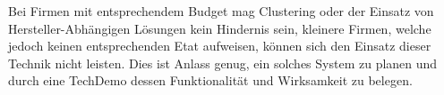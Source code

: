   Bei Firmen mit entsprechendem Budget mag Clustering oder der Einsatz von Hersteller-Abh\"angigen L\"osungen kein Hindernis sein, kleinere Firmen, welche jedoch keinen entsprechenden Etat aufweisen, k\"onnen sich den Einsatz dieser Technik nicht leisten. Dies ist Anlass genug, ein solches System zu planen und durch eine TechDemo dessen Funktionalit\"at und Wirksamkeit zu belegen.

